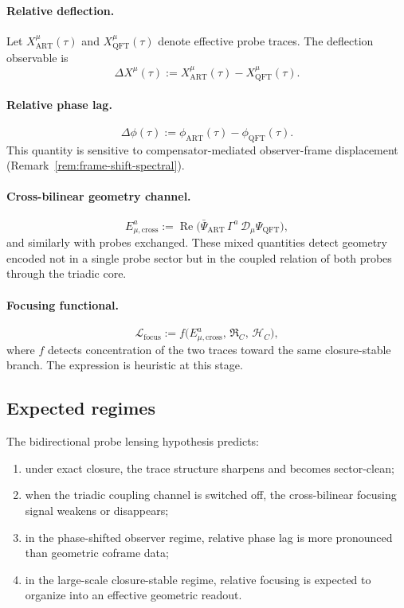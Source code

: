 \paragraph*{Relative deflection.}
Let $X^\mu_{\mathrm{ART}}(\tau)$ and $X^\mu_{\mathrm{QFT}}(\tau)$
denote effective probe traces. The deflection observable is
\[
 \Delta X^\mu(\tau)
 :=
 X^\mu_{\mathrm{ART}}(\tau) - X^\mu_{\mathrm{QFT}}(\tau).
\]

\paragraph*{Relative phase lag.}
\[
 \Delta\phi(\tau)
 :=
 \phi_{\mathrm{ART}}(\tau) - \phi_{\mathrm{QFT}}(\tau).
\]
This quantity is sensitive to compensator-mediated observer-frame
displacement (Remark~\ref{rem:frame-shift-spectral}).

\paragraph*{Cross-bilinear geometry channel.}
\[
 E^{a}_{\mu,\mathrm{cross}}
 :=
 \operatorname{Re}\bigl(
 \bar\Psi_{\mathrm{ART}}
 \,\Gamma^a\,
 \mathcal{D}_\mu
 \Psi_{\mathrm{QFT}}
 \bigr),
\]
and similarly with probes exchanged. These mixed quantities detect
geometry encoded not in a single probe sector but in the coupled
relation of both probes through the triadic core.

\paragraph*{Focusing functional.}
\[
 \mathcal{L}_{\mathrm{focus}}
 :=
 f\!\bigl(
 E^{a}_{\mu,\mathrm{cross}},\,
 \mathfrak{R}_C,\,
 \mathcal{H}_C
 \bigr),
\]
where $f$ detects concentration of the two traces toward the same
closure-stable branch. The expression is heuristic at this stage.

\subsection*{Expected regimes}

\begin{proposition}
\label{prop:expected-probe-lensing-behaviour}
The bidirectional probe lensing hypothesis predicts:
\begin{enumerate}[label=(\roman*)]
 \item under exact closure, the trace structure sharpens and becomes
 sector-clean;
 \item when the triadic coupling channel is switched off, the
 cross-bilinear focusing signal weakens or disappears;
 \item in the phase-shifted observer regime, relative phase lag is more
 pronounced than geometric coframe data;
 \item in the large-scale closure-stable regime, relative focusing is
 expected to organize into an effective geometric readout.
\end{enumerate}
\end{proposition}

